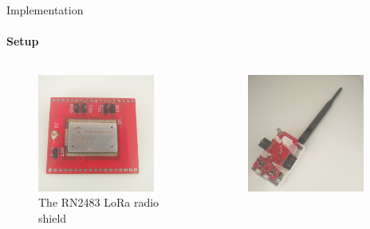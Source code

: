 \begin{frame}{Implementation}
\framesubtitle{Setup}
\begin{columns}
\begin{column}{0.4\textwidth}

\begin{figure}[H]
    \centering
    \includegraphics[width=0.9\textwidth]{presentation.tex/fig/rn2483.jpg}
    \caption{The RN2483 LoRa radio shield\label{fig:rn2483pic}}
\end{figure}
\end{column}
\begin{column}{0.4\textwidth}
\begin{figure}[H]
    \centering
    \includegraphics[width=0.9\textwidth]{presentation.tex/fig/zolertia.jpg}

\end{figure}
\end{column}
\end{columns}
\end{frame}
